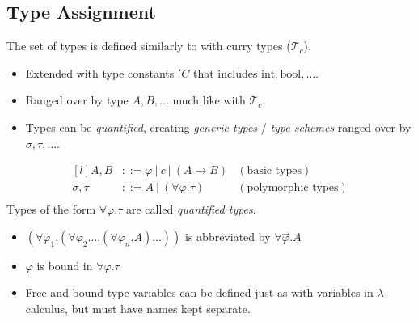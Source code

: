 \subsection{Type Assignment}
The set of types is defined similarly to with curry types ($\mathcal{T}_c$).
\begin{itemize}
	\item Extended with type constants $'C$ that includes $\text{int}, \text{bool}, \dots$.
	\item Ranged over by type $A, B, \dots$ much like with $\mathcal{T}_c$.
	\item Types can be \textit{quantified}, creating \textit{generic types} / \textit{type schemes} ranged over by $\sigma, \tau, \dots$.
\end{itemize}
\[\begin{matrix*}[l]
		A, B & ::= \varphi \ | \ c \ | \ (A \to B) & (\text{basic types}) \\
		\sigma , \tau & ::= A \ | \ (\forall \varphi . \tau) & (\text{polymorphic types}) \\
	\end{matrix*}\]
Types of the form $\forall \varphi . \tau$ are called \textit{quantified types}.
\begin{itemize}
	\item $(\forall \varphi_1 . (\forall \varphi_2 . \dots (\forall \varphi_n . A)\dots))$ is abbreviated by $\forall \overset{\rightharpoonup}{\varphi} . A$
	\item $\varphi$ is bound in $\forall \varphi . \tau$
	\item Free and bound type variables can be defined just as with variables in $\lambda$-calculus, but must have names kept separate.
\end{itemize}

